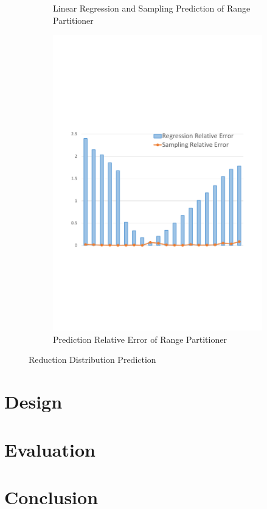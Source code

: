 \documentclass[10pt,twocolumn]{article}
\begin{document}
\begin{figure}
\begin{subfigure}[b]{0.32\linewidth}
		\caption{Linear Regression and Sampling Prediction of Range Partitioner}
		\label{fig:range_pre_sample}
	\end{subfigure}
	\begin{subfigure}[b]{0.32\linewidth}
		\includegraphics[width=\linewidth]{fig/prediction_relative_error}
		\caption{Prediction Relative Error of Range Partitioner}
		\label{fig:prediction_relative_error}
	\end{subfigure}
	\caption{Reduction Distribution Prediction}
	\label{fig:dis}
\end{figure}

\section{Design}\label{design}
\section{Evaluation}\label{evaluation}

\section{Conclusion}





\end{document}
